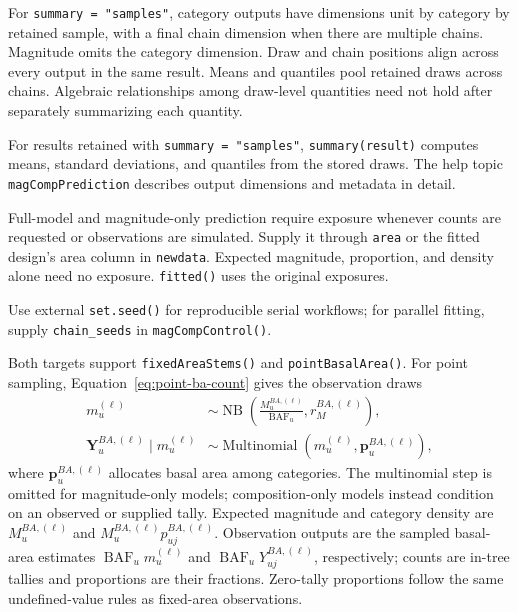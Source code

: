 \documentclass[11pt]{article}
\newcommand{\bp}{\bm{p}}
\newcommand{\NB}{\operatorname{NB}}
\newcommand{\Mult}{\operatorname{Multinomial}}
\begin{document}
For \texttt{summary = "samples"}, category outputs have dimensions
unit by category by retained sample, with a final chain dimension when there
are multiple chains. Magnitude omits the category dimension. Draw and chain
positions align across every output in the same result. Means and quantiles
pool retained draws across chains. Algebraic relationships among draw-level
quantities need not hold after separately summarizing each quantity.

For results retained with \texttt{summary = "samples"},
\texttt{summary(result)} computes means, standard deviations, and quantiles
from the stored draws. The help topic \texttt{magCompPrediction} describes
output dimensions and metadata in detail.

Full-model and magnitude-only prediction require exposure whenever counts
are requested or observations are simulated. Supply it through \texttt{area}
or the fitted design's area column in \texttt{newdata}. Expected magnitude,
proportion, and density alone need no exposure. \texttt{fitted()} uses the
original exposures.

Use external \texttt{set.seed()} for reproducible serial workflows; for
parallel fitting, supply \texttt{chain\_seeds} in \texttt{magCompControl()}.

Both targets support \texttt{fixedAreaStems()} and \texttt{pointBasalArea()}.
For point sampling, Equation~\ref{eq:point-ba-count} gives the observation draws
\begin{equation}
\begin{aligned}
  m_u^{(\ell)} &\sim \NB\!\left(
    \frac{M_u^{BA,(\ell)}}{\operatorname{BAF}_u},r_M^{BA,(\ell)}\right),\\
  \mathbf{Y}_u^{BA,(\ell)}\mid m_u^{(\ell)}
    &\sim \Mult\!\left(m_u^{(\ell)},\bp_u^{BA,(\ell)}\right),
\end{aligned}
\label{eq:point-prediction-observation}
\end{equation}
where \(\bp_u^{BA,(\ell)}\) allocates basal area among categories. The
multinomial step is omitted for magnitude-only models; composition-only models
instead condition on an observed or supplied tally. Expected magnitude and category density
are \(M_u^{BA,(\ell)}\) and \(M_u^{BA,(\ell)}p_{uj}^{BA,(\ell)}\).
Observation outputs are the sampled basal-area estimates
\(\operatorname{BAF}_u m_u^{(\ell)}\) and
\(\operatorname{BAF}_u Y_{uj}^{BA,(\ell)}\), respectively; counts are in-tree
tallies and proportions are their fractions. Zero-tally proportions follow
the same undefined-value rules as fixed-area observations.
\end{document}
